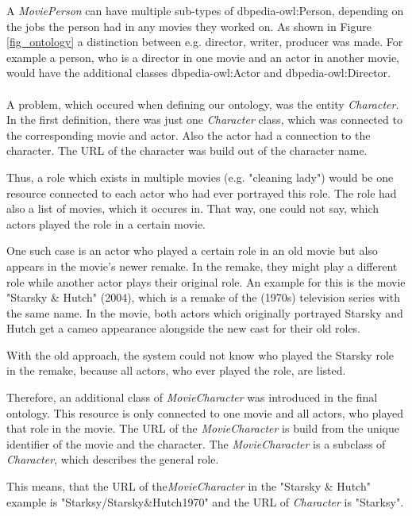 A \textit{MoviePerson} can have multiple sub-types of dbpedia-owl:Person, depending on the jobs the person had in any movies they worked on.
As shown in Figure \ref{fig_ontology} a distinction between e.g. director, writer, producer was made.
For example a person, who is a director in one movie and an actor in another movie, would have the additional classes dbpedia-owl:Actor and dbpedia-owl:Director.
\\ \\
A problem, which occured when defining our ontology, was the entity \textit{Character}.
In the first definition, there was just one \textit{Character} class, which was connected to the corresponding movie and actor.
Also the actor had a connection to the character.
The URL of the character was build out of the character name.

Thus, a role which exists in multiple movies (e.g. "cleaning lady") would be one resource connected to each actor who had ever portrayed this role.
The role had also a list of movies, which it occures in.
That way, one could not say, which actors played the role in a certain movie.

One such case is an actor who played a certain role in an old movie but also appears in the movie's newer remake.
In the remake, they might play a different role while another actor plays their original role.
An example for this is the movie "Starsky \& Hutch" (2004), which is a remake of the (1970s) television series with the same name.
In the movie, both actors which originally portrayed Starsky and Hutch get a cameo appearance alongside the new cast for their old roles.

With the old approach, the system could not know who played the Starsky role in the remake, because all actors, who ever played the role, are listed.

Therefore, an additional class of \textit{MovieCharacter} was introduced in the final ontology.
This resource is only connected to one movie and all actors, who played that role in the movie.
The URL of the \textit{MovieCharacter} is build from the unique identifier of the movie and the character.
The \textit{MovieCharacter} is a subclass of \textit{Character}, which describes the general role.

This means, that the URL of the\textit{MovieCharacter} in the "Starsky \& Hutch" example is "Starksy/Starsky\&Hutch1970" and the URL of \textit{Character} is "Starksy".

